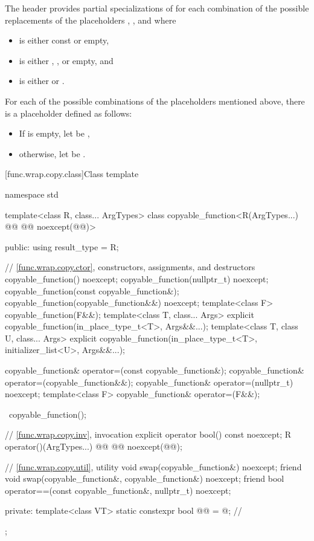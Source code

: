 \pnum
The header provides partial specializations of 
for each combination of the possible replacements
of the placeholders \cv{}, , and  where
\begin{itemize}
\item
\cv{} is either const or empty,
\item
{} is either \tcode{\&}, \tcode{\&\&}, or empty, and
\item
{} is either  or .
\end{itemize}

\pnum
For each of the possible combinations of the placeholders mentioned above,
there is a placeholder  defined as follows:
\begin{itemize}
\item
If  is empty, let  be \cv{}\tcode{\&},
\item
otherwise, let  be \cv{} .
\end{itemize}

[func.wrap.copy.class]{Class template }

%
\begin{codeblock}
namespace std {
  template<class R, class... ArgTypes>
  class copyable_function<R(ArgTypes...) @\cv{}@ @@ noexcept(@@)> {
  public:
    using result_type = R;

    // \ref{func.wrap.copy.ctor}, constructors, assignments, and destructors
    copyable_function() noexcept;
    copyable_function(nullptr_t) noexcept;
    copyable_function(const copyable_function&);
    copyable_function(copyable_function&&) noexcept;
    template<class F> copyable_function(F&&);
    template<class T, class... Args>
      explicit copyable_function(in_place_type_t<T>, Args&&...);
    template<class T, class U, class... Args>
      explicit copyable_function(in_place_type_t<T>, initializer_list<U>, Args&&...);

    copyable_function& operator=(const copyable_function&);
    copyable_function& operator=(copyable_function&&);
    copyable_function& operator=(nullptr_t) noexcept;
    template<class F> copyable_function& operator=(F&&);

    ~copyable_function();

    // \ref{func.wrap.copy.inv}, invocation
    explicit operator bool() const noexcept;
    R operator()(ArgTypes...) @\cv{}@ @@ noexcept(@@);

    // \ref{func.wrap.copy.util}, utility
    void swap(copyable_function&) noexcept;
    friend void swap(copyable_function&, copyable_function&) noexcept;
    friend bool operator==(const copyable_function&, nullptr_t) noexcept;

  private:
    template<class VT>
      static constexpr bool @@ = @\seebelow@;       // \expos
  };
}
\end{codeblock}

